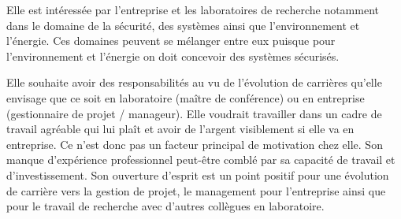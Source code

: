 \documentclass[a4paper,12pt]{article}
\begin{document}
Elle est intéressée par l'entreprise et les laboratoires de recherche notamment dans le domaine de la sécurité, des systèmes ainsi que l'environnement et l'énergie. Ces domaines peuvent se mélanger entre eux puisque pour l'environnement et l'énergie on doit concevoir des systèmes sécurisés.

Elle souhaite avoir des responsabilités au vu de l'évolution de carrières qu'elle envisage que ce soit en laboratoire (ma\^itre de conférence) ou en entreprise (gestionnaire de projet / manageur). Elle voudrait travailler dans un cadre de travail agréable qui lui pla\^it et avoir de l'argent visiblement si elle va en entreprise. Ce n'est donc pas un facteur principal de motivation chez elle. Son manque d'expérience professionnel peut-\^etre comblé par sa capacité de travail et d'investissement. Son ouverture d'esprit est un point positif pour une évolution de carrière vers la gestion de projet, le management pour l'entreprise ainsi que pour le travail de recherche avec d'autres collègues en laboratoire.
\label{fin}
\end{document}
